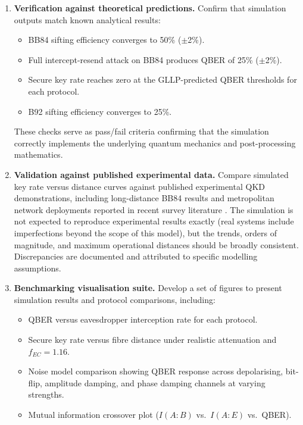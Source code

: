 \documentclass[10pt, a4paper]{report}
\begin{document}
\begin{enumerate}[label=\textbf{O5.\arabic*}, leftmargin=1.5cm]
    \item \textbf{Verification against theoretical predictions.} Confirm that simulation outputs match known analytical results:
    \begin{itemize}
        \item BB84 sifting efficiency converges to 50\% ($\pm$2\%).
        \item Full intercept-resend attack on BB84 produces QBER of 25\% ($\pm$2\%).
        \item Secure key rate reaches zero at the GLLP-predicted QBER thresholds for each protocol.
        \item B92 sifting efficiency converges to 25\%.
    \end{itemize}
    These checks serve as pass/fail criteria confirming that the simulation correctly implements the underlying quantum mechanics and post-processing mathematics.

    \item \textbf{Validation against published experimental data.} Compare simulated key rate versus distance curves against published experimental QKD demonstrations, including long-distance BB84 results \cite{Boaron2018} and metropolitan network deployments reported in recent survey literature \cite{Zhang2025}. The simulation is not expected to reproduce experimental results exactly (real systems include imperfections beyond the scope of this model), but the trends, orders of magnitude, and maximum operational distances should be broadly consistent. Discrepancies are documented and attributed to specific modelling assumptions.

    \item \textbf{Benchmarking visualisation suite.} Develop a set of figures to present simulation results and protocol comparisons, including:
    \begin{itemize}
        \item QBER versus eavesdropper interception rate for each protocol.
        \item Secure key rate versus fibre distance under realistic attenuation and $f_{EC} = 1.16$.
        \item Noise model comparison showing QBER response across depolarising, bit-flip, amplitude damping, and phase damping channels at varying strengths.
        \item Mutual information crossover plot ($I(A{:}B)$ vs.\ $I(A{:}E)$ vs.\ QBER).
    \end{itemize}
\end{enumerate}
\end{document}
